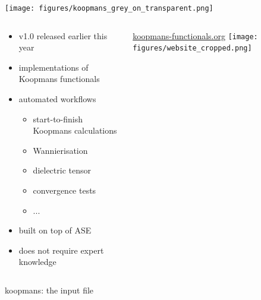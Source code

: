 \documentclass[xcolor=table,aspectratio=169]{beamer}
\numberwithin{equation}{section}
\begin{document}
\begin{frame}{}
   \begin{center}
      \texttt{[image: figures/koopmans\_grey\_on\_transparent.png]}
   \end{center}

   \vspace{-2ex}

   \begin{columns}
      \begin{column}{0.55\textwidth}
         \begin{itemize}
            \item v1.0 released earlier this year\footnotemark[1]
            \item implementations of Koopmans functionals
            \item automated workflows
                  \begin{itemize}
                     \item start-to-finish Koopmans calculations
                     \item Wannierisation
                     \item dielectric tensor
                     \item convergence tests
                     \item ...
                  \end{itemize}
            \item built on top of ASE\footnotemark[2]
            \item does not require expert knowledge
         \end{itemize}
      \end{column}

      \begin{column}{0.4\textwidth}
         \centering
         \url{koopmans-functionals.org}
         \texttt{[image: figures/website\_cropped.png]}
      \end{column}
   \end{columns}
\end{frame}

\begin{frame}{koopmans: the input file}
   \begin{minipage}[t]{0.475\columnwidth}
      \inputminted[fontsize=\tiny,breaklines,lastline=20]{json}{scripts/si.json}
   \end{minipage}
   \hspace{0.025\textwidth}
   \begin{minipage}[t]{0.475\columnwidth}
      \inputminted[fontsize=\tiny,breaklines,firstline=21]{json}{scripts/si.json}
   \end{minipage}
\end{frame}
\end{document}
